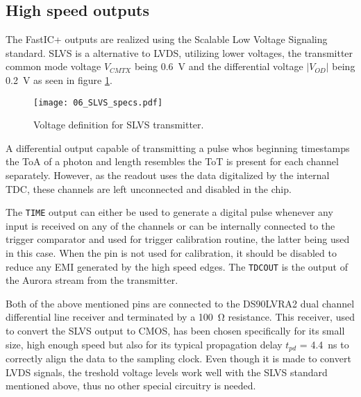 \subsection{High speed outputs}
%
The FastIC+ outputs are realized using the Scalable Low Voltage Signaling standard. SLVS is a alternative to LVDS, utilizing lower voltages, the transmitter common mode voltage $V_{CMTX}$ being \SI{0.6}{\volt} and the differential voltage $|V_{OD}|$ being \SI{0.2}{\volt} as seen in figure \ref{fig:slvs_voltages}.

\begin{figure}[ht]
	\begin{center}
		\texttt{[image: 06\_SLVS\_specs.pdf]}
	\end{center}
	\vspace{-5mm}
	\caption{Voltage definition for SLVS transmitter.}
	\label{fig:slvs_voltages}
\end{figure}

A differential output capable of transmitting a pulse whos beginning timestamps the ToA of a photon and length resembles the ToT is present for each channel separately. However, as the readout uses the data digitalized by the internal TDC, these channels are left unconnected and disabled in the chip.

The \verb|TIME| output can either be used to generate a digital pulse whenever any input is received on any of the channels or can be internally connected to the trigger comparator and used for trigger calibration routine, the latter being used in this case. When the pin is not used for calibration, it should be disabled to reduce any EMI generated by the high speed edges. The \verb|TDCOUT| is the output of the Aurora stream from the transmitter.

Both of the above mentioned pins are connected to the DS90LVRA2 dual channel differential line receiver and terminated by a \SI{100}{\ohm} resistance. This receiver, used to convert the SLVS output to CMOS, has been chosen specifically for its small size, high enough speed but also for its typical propagation delay $t_{pd}$ = \SI{4.4}{\nano\second} to correctly align the data to the sampling clock. Even though it is made to convert LVDS signals, the treshold voltage levels work well with the SLVS standard mentioned above, thus no other special circuitry is needed. 

